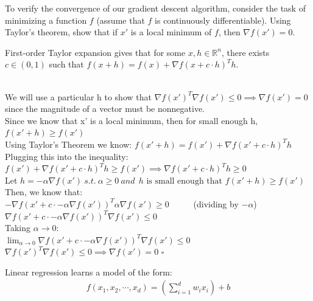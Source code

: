 \begin{problem}[3]
    To verify the convergence of our gradient descent algorithm, consider the task of minimizing a function $f$ (assume that $f$ is continuously differentiable). Using Taylor's theorem, show that if $x'$ is a local minimum of $f$, then $\nabla f(x') = 0$.
\end{problem}
\begin{hint}
  First-order Taylor expansion gives that for some $x, h \in \mathbb{R}^n$, there exists $c \in (0, 1)$ such that $f(x + h) = f(x) + \nabla f(x + c\cdot h)^T h$.
  
\end{hint}
\begin{solution}
  \\ We will use a particular h to show that $\nabla f(x')^T \nabla f(x') \leq 0 \implies \nabla f(x') = 0$ since the magnitude of a vector must be nonnegative.
  \\ Since we know that x' is a local minimum, then for small enough h, $f(x'+h) \geq f(x')$
  \\ Using Taylor's Theorem we know: $f(x' + h) = f(x') + \nabla f(x' + c\cdot h)^T h$
  \\ Plugging this into the inequality: 
  \\ $f(x') + \nabla f(x' + c\cdot h)^T h \geq f(x')\implies \nabla f(x' + c\cdot h)^T h \geq 0$
  \\ Let $h = -\alpha \nabla f(x') \ s.t. \ \alpha \geq 0 \ and \ \ h \text{ is small enough that } f(x' + h) \geq f(x')$
  \\ Then, we know that:
  \\ $-\nabla f(x' + c\cdot -\alpha \nabla f(x'))^T \alpha \nabla f(x') \geq 0$ \ \ \ \ \ (dividing by $-\alpha$)
  \\ $\nabla f(x' + c\cdot -\alpha \nabla f(x'))^T \nabla f(x') \leq 0$
  \\ Taking $\alpha \to 0$:
  \\ $\lim_{\alpha \to 0} \nabla f(x' + c\cdot -\alpha \nabla f(x'))^T \nabla f(x') \leq 0$
  \\ $\nabla f(x')^T \nabla f(x') \leq 0 \implies \nabla f(x') = 0$ \hfill $\square$
\end{solution}

Linear regression learns a model of the form:
\begin{align*}
  f(x_1, x_2, \cdots, x_d) = \left(\sum_{i=1}^d w_i x_i\right) + b
\end{align*}

